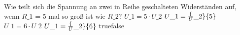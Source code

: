     {Wie teilt sich die Spannung an zwei in Reihe geschalteten Widerständen auf, wenn $R\_1$ = 5-mal so groß ist wie $R\_2$?}
    {$U\_1 = 5\cdot U\_2$}
    {$U\_1 = \frac\{U\_2\}\{5\}$}
    {$U\_1 = 6\cdot U\_2$}
    {$U\_1 = \frac\{U\_2\}\{6\}$}
    {true}{false}